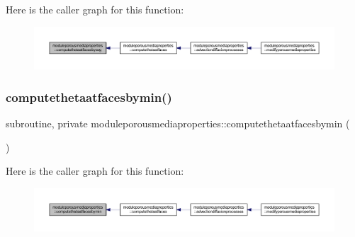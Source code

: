 Here is the caller graph for this function\+:\nopagebreak
\begin{figure}[H]
\begin{center}
\leavevmode
\includegraphics[width=350pt]{namespacemoduleporousmediaproperties_ac3225dfdb6a7475838f45e43263a61a9_icgraph}
\end{center}
\end{figure}
\mbox{\label{namespacemoduleporousmediaproperties_a14becd6de87b194f724f94c34247ee36}} 
\subsubsection{\texorpdfstring{computethetaatfacesbymin()}{computethetaatfacesbymin()}}
{\footnotesize\ttfamily subroutine, private moduleporousmediaproperties\+::computethetaatfacesbymin (\begin{DoxyParamCaption}{ }\end{DoxyParamCaption})\hspace{0.3cm}{\ttfamily [private]}}

Here is the caller graph for this function\+:\nopagebreak
\begin{figure}[H]
\begin{center}
\leavevmode
\includegraphics[width=350pt]{namespacemoduleporousmediaproperties_a14becd6de87b194f724f94c34247ee36_icgraph}
\end{center}
\end{figure}
\mbox{\label{namespacemoduleporousmediaproperties_a8fba489b1d7b502e23196a791d678e03}} 
